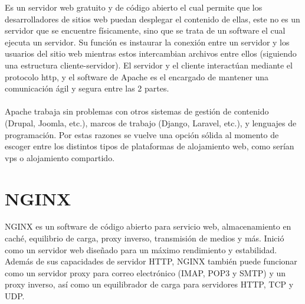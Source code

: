 \documentclass[12pt, a4paper, titlepage]{report}
\begin{document}
	 	Es un servidor web gratuito y de código abierto el cual permite que los desarrolladores de sitios web puedan desplegar el contenido de ellas, este no es un servidor que se encuentre físicamente, sino que se trata de un software el cual ejecuta un servidor. Su función es instaurar la conexión entre un servidor y los usuarios del sitio web mientras estos intercambian archivos entre ellos (siguiendo una estructura cliente-servidor). El servidor y el cliente interactúan mediante el protocolo \acrshort{http}, y el software de Apache es el encargado de mantener una comunicación ágil y segura entre las 2 partes.\\\\
	 	Apache trabaja sin problemas con otros sistemas de gestión de contenido (Drupal, Joomla, etc.), marcos de trabajo (Django, Laravel, etc.), y lenguajes de programación. Por estas razones se vuelve una opción sólida al momento de escoger entre los distintos tipos de plataformas de alojamiento web, como serían \acrfull{vps} o alojamiento compartido.\\
		
		\section{NGINX}
		
		NGINX es un software de código abierto para servicio web, almacenamiento en caché, equilibrio de carga, proxy inverso, transmisión de medios y más. Inició como un servidor web diseñado para un máximo rendimiento y estabilidad. Además de sus capacidades de servidor HTTP, NGINX también puede funcionar como un servidor proxy para correo electrónico (IMAP, POP3 y SMTP) y un proxy inverso, así como un equilibrador de carga para servidores HTTP, TCP y UDP.\cite{refNginx}\\
		
		
		\newpage
			
\end{document}
